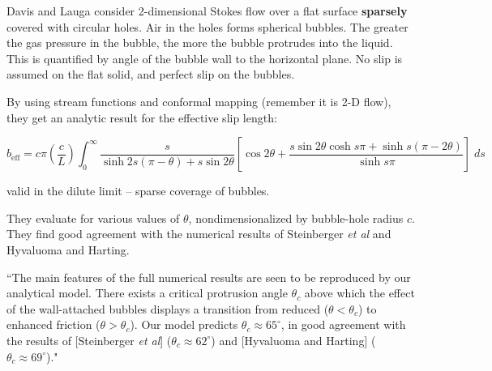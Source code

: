 \documentclass{article}
\newcommand{\beff}{\ensuremath{b_{\mathrm{eff}}}}
\begin{document}
Davis and Lauga consider 2-dimensional Stokes flow over a flat surface \textbf{sparsely} covered with circular holes.  Air in the holes forms spherical bubbles.  The greater the gas pressure in the bubble, the more the bubble protrudes into the liquid.  This is quantified by angle of the bubble wall to the horizontal plane.  No slip is assumed on the flat solid, and perfect slip on the bubbles.

\vspace*{1em}

\vspace*{1em}

By using stream functions and conformal mapping (remember it is 2-D flow), they get an analytic result for the effective slip length:

\[
\beff = c \pi \left( \frac{c}{L} \right) \int_0^{\infty}
\frac{s}{\sinh 2s(\pi - \theta) + s \sin 2 \theta}
\left[ \cos 2 \theta +
\frac{s \sin 2 \theta \cosh s \pi + \sinh s(\pi - 2 \theta)}{\sinh s \pi}
\right] \; ds
\]

valid in the dilute limit -- sparse coverage of bubbles.

They evaluate for various values of $\theta$, nondimensionalized by bubble-hole radius $c$.  They find good agreement with the numerical results of Steinberger \emph{et al} and Hyvaluoma and Harting.

``The main features of the full numerical results are seen to be reproduced by our analytical model.  There exists a critical protrusion angle $\theta_c$ above which the effect of the wall-attached bubbles displays a transition from reduced ($\theta < \theta_c$) to enhanced friction ($\theta > \theta_c$).  Our model predicts $\theta_c \approx 65^{\circ}$, in good agreement with the results of [Steinberger \emph{et al}] ($\theta_c \approx 62^{\circ}$) and [Hyvaluoma and Harting] ($\theta_c \approx 69^{\circ}$)."
\end{document}
